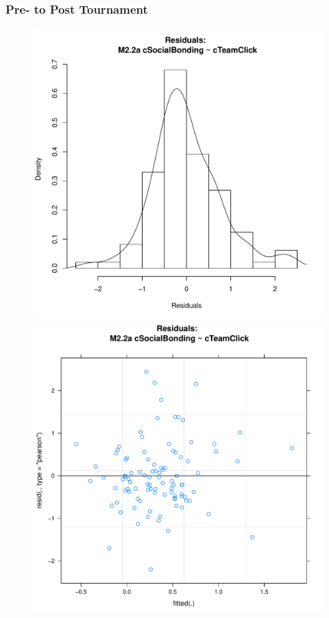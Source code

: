 {      \subsubsection{Pre- to Post Tournament}


      


      \begin{figure}[htbp]
        \includegraphics[scale =.4]{images/MLM22aHist.pdf}
        \includegraphics[scale =.4]{images/MLM22aScatter.pdf}

\end{figure}}
